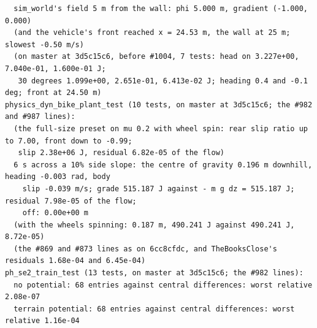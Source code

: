 \documentclass[11pt]{article}
\theoremstyle{remark}
\begin{document}
\begin{center}
\begin{minipage}{0.98\linewidth}
\begin{verbatim}
  sim_world's field 5 m from the wall: phi 5.000 m, gradient (-1.000, 0.000)
  (and the vehicle's front reached x = 24.53 m, the wall at 25 m; slowest -0.50 m/s)
  (on master at 3d5c15c6, before #1004, 7 tests: head on 3.227e+00, 7.040e-01, 1.600e-01 J;
   30 degrees 1.099e+00, 2.651e-01, 6.413e-02 J; heading 0.4 and -0.1 deg; front at 24.50 m)
physics_dyn_bike_plant_test (10 tests, on master at 3d5c15c6; the #982 and #987 lines):
  (the full-size preset on mu 0.2 with wheel spin: rear slip ratio up to 7.00, front down to -0.99;
   slip 2.38e+06 J, residual 6.82e-05 of the flow)
  6 s across a 10% side slope: the centre of gravity 0.196 m downhill, heading -0.003 rad, body
    slip -0.039 m/s; grade 515.187 J against - m g dz = 515.187 J; residual 7.98e-05 of the flow;
    off: 0.00e+00 m
  (with the wheels spinning: 0.187 m, 490.241 J against 490.241 J, 8.72e-05)
  (the #869 and #873 lines as on 6cc8cfdc, and TheBooksClose's residuals 1.68e-04 and 6.45e-04)
ph_se2_train_test (13 tests, on master at 3d5c15c6; the #982 lines):
  no potential: 68 entries against central differences: worst relative 2.08e-07
  terrain potential: 68 entries against central differences: worst relative 1.16e-04
\end{verbatim}
\end{minipage}
\end{center}
\end{document}

